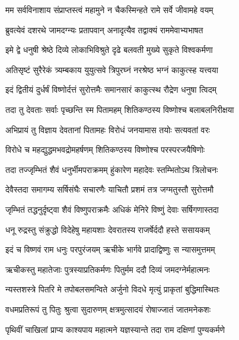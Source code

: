 \twolineshloka
{मम सर्वविनाशाय संप्राप्तस्त्वं महामुने}
{न चैकस्मिन्हते रामे सर्वे जीवामहे वयम्} %

\twolineshloka
{ब्रुवत्येवं दशरथे जामदग्न्यः प्रतापवान्}
{अनादृत्यैव तद्वाक्यं राममेवाभ्यभाषत} %

\twolineshloka
{इमे द्वे धनुषी श्रेष्ठे दिव्ये लोकाभिविश्रुते}
{दृढे बलवती मुख्ये सुकृते विश्वकर्मणा} %

\twolineshloka
{अतिसृष्टं सुरैरेकं त्र्यम्बकाय युयुत्सवे}
{त्रिपुरघ्नं नरश्रेष्ठ भग्नं काकुत्स्ह यत्त्वया} %

\twolineshloka
{इदं द्वितीयं दुर्धर्षं विष्णोर्दत्तं सुरोत्तमैः}
{समानसारं काकुत्स्थ रौद्रेण धनुषा त्विदम्} %

\twolineshloka
{तदा तु देवताः सर्वाः पृच्छन्ति स्म पितामहम्}
{शितिकण्ठस्य विष्णोश्च बलाबलनिरीक्षया} %

\twolineshloka
{अभिप्रायं तु विज्ञाय देवतानां पितामहः}
{विरोधं जनयामास तयोः सत्यवतां वरः} %

\twolineshloka
{विरोधे च महद्युद्धमभवद्रोमहर्षणम्}
{शितिकण्ठस्य विष्णोश्च परस्परजयैषिणोः} %

\twolineshloka
{तदा तज्जृम्भितं शैवं धनुर्भीमपराक्रमम्}
{हुंकारेण महादेवः स्तम्भितोऽथ त्रिलोचनः} %

\twolineshloka
{देवैस्तदा समागम्य सर्षिसंघैः सचारणैः}
{याचितौ प्रशमं तत्र जग्मतुस्तौ सुरोत्तमौ} %

\twolineshloka
{जृम्भितं तद्धनुर्दृष्ट्वा शैवं विष्णुपराक्रमैः}
{अधिकं मेनिरे विष्णुं देवाः सर्षिगणास्तदा} %

\twolineshloka
{धनू रुद्रस्तु संक्रुद्धो विदेहेषु महायशाः}
{देवरातस्य राजर्षेर्ददौ हस्ते ससायकम्} %

\twolineshloka
{इदं च विष्णवं राम धनुः परपुरंजयम्}
{ऋचीके भार्गवे प्रादाद्विष्णुः स न्यासमुत्तमम्} %

\twolineshloka
{ऋचीकस्तु महातेजाः पुत्रस्याप्रतिकर्मणः}
{पितुर्मम ददौ दिव्यं जमदग्नेर्महात्मनः} %

\twolineshloka
{न्यस्तशस्त्रे पितरि मे तपोबलसमन्विते}
{अर्जुनो विदधे मृत्युं प्राकृतां बुद्धिमास्थितः} %

\twolineshloka
{वधमप्रतिरूपं तु पितुः श्रुत्वा सुदारुणम्}
{क्षत्रमुत्सादयं रोषाज्जातं जातमनेकशः} %

\twolineshloka
{पृथिवीं चाखिलां प्राप्य काश्यपाय महात्मने}
{यज्ञस्यान्ते तदा राम दक्षिणां पुण्यकर्मणे} %


